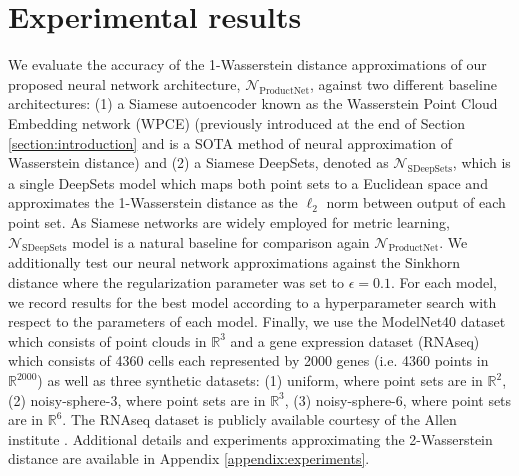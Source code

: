 \documentclass[12pt]{article}
\newcommand{\R}{\mathbb R}
\newcommand{\Network}{\mathcal{N}_{\mathrm{ProductNet}}}
\begin{document}
\section{Experimental results}
\label{section:experiments}
We evaluate the accuracy of the 1-Wasserstein distance approximations of our proposed neural network architecture, {\bf $\Network$}, against two different baseline architectures: (1) a Siamese autoencoder known as the Wasserstein Point Cloud Embedding network (WPCE) \citep{kawano2020learning} (previously introduced at the end of Section \ref{section:introduction} and is a SOTA method of neural approximation of Wasserstein distance) and (2) a Siamese DeepSets, denoted as $\mathcal{N}_{\mathrm{SDeepSets}}$, which is a single DeepSets model which maps both point sets to a Euclidean space and approximates the 1-Wasserstein distance as the $\ell_2$ norm between output of each point set. As Siamese networks are widely employed for metric learning, $\mathcal{N}_{\mathrm{SDeepSets}}$ model is a natural baseline for comparison again $\Network$. We additionally test our neural network approximations against the Sinkhorn distance where the regularization parameter was set to $\epsilon=0.1$. For each model, we record results for the best model according to a hyperparameter search with respect to the parameters of each model. Finally, we use the ModelNet40 \citep{wu20153d} dataset which consists of point clouds in $\R^3$ and a gene expression dataset (RNAseq) which consists of 4360 cells each represented by 2000 genes (i.e. 4360 points in $\R^{2000}$) as well as three synthetic datasets: (1) uniform, where point sets are in $\R^2$, (2) noisy-sphere-3, where point sets are in $\R^3$, (3) noisy-sphere-6, where point sets are in $\R^6$. The RNAseq dataset is publicly available courtesy of the Allen institute \citep{yao2021taxonomy}. Additional details and experiments approximating the 2-Wasserstein distance are available in Appendix \ref{appendix:experiments}.


\end{document}
